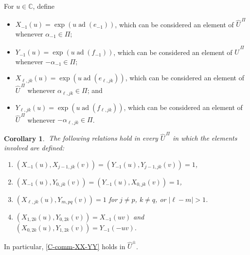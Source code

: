 \documentclass[11pt,letterpaper]{amsart}
\newcounter{thecounter}
\numberwithin{thecounter}{section}
\newtheorem{corollary}[thecounter]{Corollary}
\theoremstyle{definition}
\DeclareMathOperator{\ad}{ad}
\renewcommand{\a}{\alpha}
\newcommand{\C}{{\mathbb C}}
\newcommand{\Uhpm}{{\widehat{U}^\pm}}
\begin{document}
For $u\in\C$, define
\begin{itemize}
\item $X_{-1}(u)=\exp\left(u\ad\left(e_{-1}\right)\right)$, which can be considered an element of  $\widehat{U}^{\,\Pi}$ 
whenever $\a_{-1}\in\Pi$;
\item $Y_{-1}(u)=\exp\left(u\ad\left(f_{-1}\right)\right)$, which can be considered an element of  $\widehat{U}^{\,\Pi}$ 
whenever $-\a_{-1}\in\Pi$;
\item $X_{\ell,jk}(u)=\exp\left(u\ad\left(e_{\ell,jk}\right)\right)$, which can be considered an element of  
$\widehat{U}^{\,\Pi}$ whenever $\a_{\ell,jk}\in\Pi$; and
\item $Y_{\ell,jk}(u)=\exp\left(u\ad\left(f_{\ell,jk}\right)\right)$, which can be considered an element of  $\widehat{U}^{\,\Pi}$ 
whenever $-\a_{\ell,jk}\in\Pi$.
\end{itemize}
\begin{corollary} $\;$\label{C-comm}
The following relations hold in every $\widehat{U}^{\,\Pi}$ in which the elements involved are defined:
\begin{enumerate}
\item\label{C-comm-XX-YY} $\left(X_{-1}(u),X_{j-1,jk}(v)\right) = \left(Y_{-1}(u),Y_{j-1,jk}(v)\right) = 1$, %
\item $\left(X_{-1}(u),Y_{0,jk}(v)\right) = \left(Y_{-1}(u),X_{0,jk}(v)\right) = 1$, %
\item $\left(X_{\ell,jk}(u),Y_{m,pq}(v)\right) =1$ for $j\ne p$, $k\ne q$, or $\left|\ell-m\right|>1$. %
\item $\left(X_{1,2k}(u),Y_{0,2k}(v)\right)=X_{-1}(uv)$ and $\left(X_{0,2k}(u),Y_{1,2k}(v)\right)=Y_{-1}(-uv)$.
\end{enumerate}
\end{corollary}
In particular, \eqref{C-comm-XX-YY} holds in $\Uhpm$.





\end{document}
